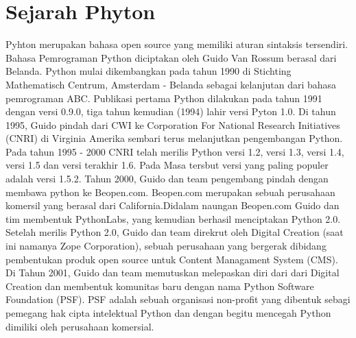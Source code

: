 \documentclass{wileySix}
\begin{document}
\booktitle{}
\subtitle{D}





\begin{introduction}

\end{introduction}


\chapter{Sejarah Phyton}
{Pyhton merupakan bahasa open source yang memiliki aturan sintaksis tersendiri. Bahasa Pemrograman Python diciptakan oleh Guido Van Rossum berasal dari Belanda. Python mulai dikembangkan pada tahun 1990 di Stichting Mathematisch Centrum, Amsterdam -  Belanda sebagai kelanjutan dari bahasa pemrograman ABC.
Publikasi pertama Python dilakukan pada tahun 1991 dengan versi 0.9.0, tiga tahun kemudian (1994) lahir versi Pyton 1.0. Di tahun 1995, Guido pindah dari CWI ke Corporation For National Research Initiatives (CNRI) di Virginia Amerika sembari terus melanjutkan pengembangan Python.
Pada tahun 1995 - 2000 CNRI telah merilis Python versi 1.2, versi 1.3, versi 1.4, versi 1.5 dan versi terakhir 1.6. Pada Masa tersbut versi yang paling populer adalah versi 1.5.2.
Tahun 2000, Guido dan team pengembang pindah dengan membawa python ke Beopen.com. Beopen.com merupakan sebuah perusahaan komersil yang berasal dari California.Didalam naungan Beopen.com Guido dan tim membentuk PythonLabs, yang kemudian berhasil menciptakan Python 2.0. Setelah merilis Python 2.0, Guido dan team direkrut oleh Digital Creation (saat ini namanya Zope Corporation), sebuah perusahaan yang bergerak dibidang pembentukan produk open source untuk Content Managament System (CMS).
Di Tahun 2001, Guido dan team memutuskan melepaskan diri dari dari Digital Creation dan membentuk komunitas baru dengan nama Python Software Foundation (PSF). PSF adalah sebuah organisasi non-profit yang dibentuk sebagi pemegang hak cipta intelektual Python dan dengan begitu mencegah Python dimiliki oleh perusahaan komersial.
}
\end{document}
